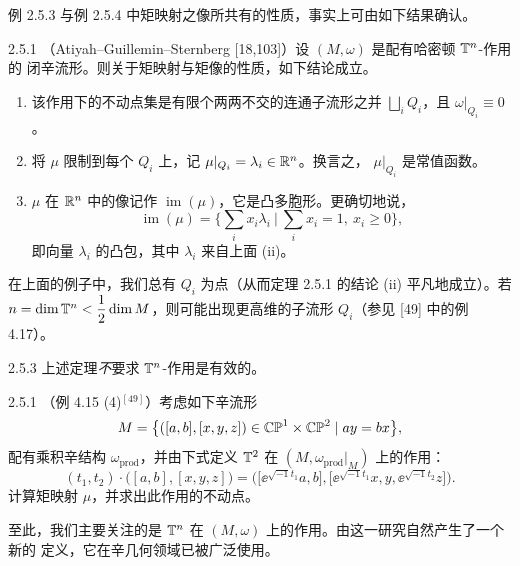 例 2.5.3 与例 2.5.4 中矩映射之像所共有的性质，事实上可由如下结果确认。

\begin{wthm}{2.5.1}
（Atiyah--Guillemin--Sternberg [18,103]）设 $(M,\omega)$ 是配有哈密顿 $\mathbb{T}^n$-作用的
闭辛流形。则关于矩映射与矩像的性质，如下结论成立。
\begin{enumerate}[label=(\roman*)]
  \item 该作用下的不动点集是有限个两两不交的连通子流形之并
        $\bigsqcup_iQ_i$，且 $\omega|_{Q_i}\equiv0$。
  \item 将 $\mu$ 限制到每个 $Q_i$ 上，记 $\mu|_{Q_i}=\lambda_i\in\mathbb{R}^n$。换言之，
        $\mu|_{Q_i}$ 是常值函数。
  \item $\mu$ 在 $\mathbb{R}^n$ 中的像记作 $\operatorname{im}(\mu)$，它是凸多胞形。更确切地说，
        \[
          \operatorname{im}(\mu)
          =\Big\{\sum_ix_i\lambda_i\ \Big|\ \sum_ix_i=1,\ x_i\ge0\Big\},
        \]
        即向量 $\lambda_i$ 的凸包，其中 $\lambda_i$ 来自上面 (ii)。
\end{enumerate}
\end{wthm}

在上面的例子中，我们总有 $Q_i$ 为点（从而定理 2.5.1 的结论 (ii) 平凡地成立）。若
$n=\dim\mathbb{T}^n<\dfrac12\dim M$，则可能出现更高维的子流形 $Q_i$（参见 [49] 中的例 4.17）。

\begin{wrem}{2.5.3}
上述定理\emph{不}要求 $\mathbb{T}^n$-作用是有效的。
\end{wrem}

\begin{wexer}{2.5.1}
（例 4.15 (4)$^{[49]}$）考虑如下辛流形
\[
  M=\big\{([a,b],[x,y,z])\in\mathbb{CP}^1\times\mathbb{CP}^2\mid ay=bx\big\},
\]
配有乘积辛结构 $\omega_{\mathrm{prod}}$，并由下式定义 $\mathbb{T}^2$ 在
$(M,\omega_{\mathrm{prod}}|_M)$ 上的作用：
\[
  (t_1,t_2)\cdot\big([a,b],[x,y,z]\big)
  =\Big(\big[\ee^{\sqrt{-1}t_1}a,b\big],
  \big[\ee^{\sqrt{-1}t_1}x,y,\ee^{\sqrt{-1}t_2}z\big]\Big).
\]
计算矩映射 $\mu$，并求出此作用的不动点。
\end{wexer}

至此，我们主要关注的是 $\mathbb{T}^n$ 在 $(M,\omega)$ 上的作用。由这一研究自然产生了一个新的
定义，它在辛几何领域已被广泛使用。

